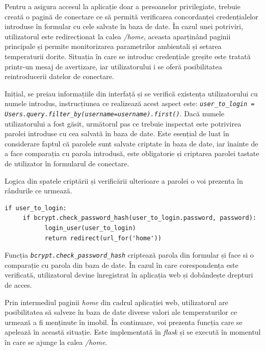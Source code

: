 	Pentru a asigura accesul la aplicație doar a persoanelor privilegiate, trebuie creată o pagină de conectare ce să permită verificarea concordanței credențialelor introduse în formular cu cele salvate în baza de date. În cazul unei potriviri, utilizatorul este redirecționat la calea \textit{/home}, aceasta aparținând paginii principale și permite monitorizarea parametrilor ambientali și setarea  temperaturii dorite. Situația în care se introduc credențiale greșite este tratată printr-un mesaj de avertizare, iar utilizatorului i se oferă posibilitatea reintroducerii datelor de conectare.

	Inițial, se preiau informațiile din interfață și se verifică existența utilizatorului cu numele introdus, instrucțiunea ce realizează acest aspect este: \textit{\texttt{user\_to\_login = Users.query.filter\_by(username=username).first()}}. Dacă numele utilizatorului a fost găsit, următorul pas ce trebuie inspectat este potrivirea parolei introduse cu cea salvată în baza de date. Este esențial de luat în considerare faptul că parolele sunt salvate criptate în baza de date, iar înainte de a face comparația cu parola introdusă, este obligatorie și criptarea parolei tastate de utilizator în formularul de conectare. 

	Logica din spatele criptării și verificării ulterioare a parolei o voi prezenta în rândurile ce urmează.

\vspace{1em}	
\begin{lstlisting}	
if user_to_login:
     if bcrypt.check_password_hash(user_to_login.password, password):
           login_user(user_to_login)
           return redirect(url_for('home'))
\end{lstlisting}
\vspace{1em} 	

	Funcția \textit{\texttt{bcrypt.check\_password\_hash}} criptează parola din formular și face si o comparație cu parola din baza de date. În cazul în care corespondența este verificată, utilizatorul devine înregistrat în aplicația web și dobândește drepturi de acces.
  
\vspace{2em}

	Prin intermediul paginii \textit{home} din cadrul aplicației web, utilizatorul are posibilitatea să salveze în baza de date diverse valori ale temperaturilor ce urmează a fi menținute în imobil. În continuare, voi prezenta funcția care se apelează în această situație. Este implementată în \textit{flask} și se execută în momentul în care se ajunge la calea \textit{/home}. 

